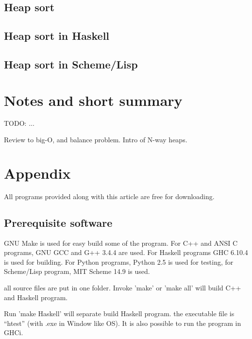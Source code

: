 \documentclass{article}
\begin{document}
\subsection{Heap sort}

\subsection*{Heap sort in Haskell}

\subsection*{Heap sort in Scheme/Lisp}


\section{Notes and short summary}

TODO: ...

Review to big-O, and balance problem.
Intro of N-way heaps.


\section{Appendix} \label{appendix}
All programs provided along with this article are free for
downloading.

\subsection{Prerequisite software}
GNU Make is used for easy build some of the program. For C++ and ANSI C programs,
GNU GCC and G++ 3.4.4 are used. 
For Haskell programs GHC 6.10.4 is used
for building. For Python programs, Python 2.5 is used for testing, for
Scheme/Lisp program, MIT Scheme 14.9 is used.

all source files are put in one folder. Invoke 'make' or 'make all'
will build C++ and Haskell program. 

Run 'make Haskell' will separate build Haskell program. the executable
file is ``htest'' (with .exe
in Window like OS). It is also possible to run the program in GHCi.
\end{document}
